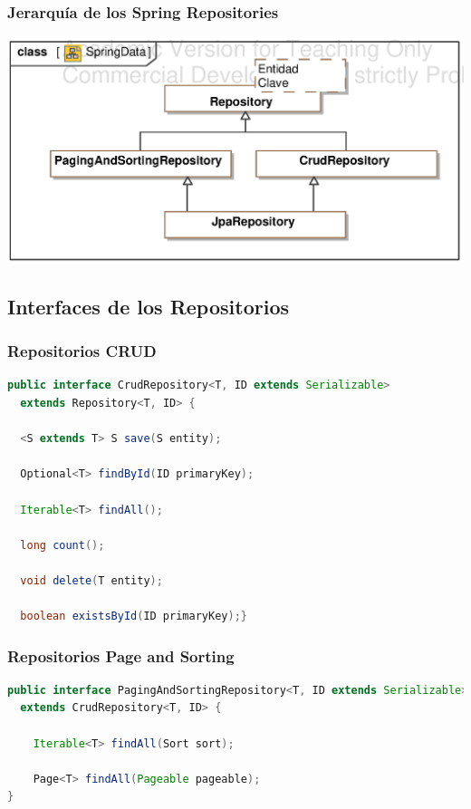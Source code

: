 \documentclass[handout,a4paper,slidestop,xcolor=pst,blue]{beamer}
\begin{document}
\begin{frame}[c]
    \frametitle{Jerarquía de los Spring Repositories}
    \begin{center}
        \includegraphics[width=.8\linewidth]{images/spring/SpringData.eps}
    \end{center}
\end{frame}

\subsection{Interfaces de los Repositorios}

\begin{frame}[c,fragile]
    \frametitle{Repositorios CRUD}
    \begin{lstlisting}[basicstyle=\footnotesize,language=Java]
public interface CrudRepository<T, ID extends Serializable>
  extends Repository<T, ID> {

  <S extends T> S save(S entity);

  Optional<T> findById(ID primaryKey);

  Iterable<T> findAll();

  long count();

  void delete(T entity);

  boolean existsById(ID primaryKey);}

\end{lstlisting}
\end{frame}

\begin{frame}[c,fragile]
    \frametitle{Repositorios Page and Sorting}
    \begin{lstlisting}[basicstyle=\footnotesize,language=Java]
public interface PagingAndSortingRepository<T, ID extends Serializable>
  extends CrudRepository<T, ID> {

    Iterable<T> findAll(Sort sort);

    Page<T> findAll(Pageable pageable);
}
    \end{lstlisting}
\end{frame}
\end{document}
